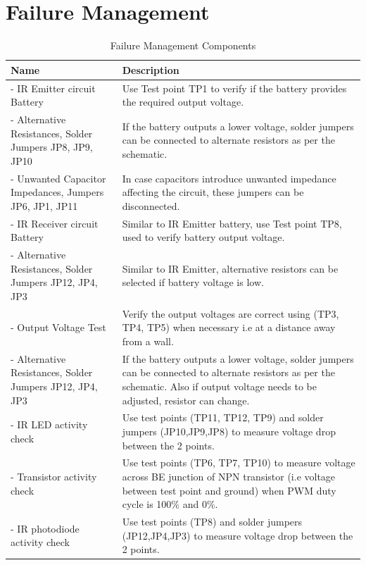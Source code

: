 \documentclass[class=report,11pt,crop=false]{standalone}
\begin{document}
  
\section{Failure Management}

\begin{table}[h]
    \centering
    \caption{Failure Management Components} 
    \label{tab:failuremanagement}
    \begin{tabular}{|p{5cm}|p{10cm}|}
        \hline
        \textbf{Name} & \textbf{Description} \\
        \hline
        - IR Emitter circuit Battery & Use Test point TP1 to verify if the battery provides the required output voltage. \\
        \hline
        - Alternative Resistances, Solder Jumpers JP8, JP9, JP10 & If the battery outputs a lower voltage, solder jumpers can be connected to alternate resistors as per the schematic. \\
        \hline
        - Unwanted Capacitor Impedances, Jumpers JP6, JP1, JP11 & In case capacitors introduce unwanted impedance affecting the circuit, these jumpers can be disconnected. \\
        \hline
        - IR Receiver circuit Battery & Similar to IR Emitter battery, use Test point TP8, used to verify battery output voltage. \\
        \hline
        - Alternative Resistances, Solder Jumpers JP12, JP4, JP3 & Similar to IR Emitter, alternative resistors can be selected if battery voltage is low. \\
        \hline
        - Output Voltage Test & Verify the output voltages are correct using (TP3, TP4, TP5) when necessary i.e at a distance away from a wall. \\
        \hline
        - Alternative Resistances, Solder Jumpers JP12, JP4, JP3 & If the battery outputs a lower voltage, solder jumpers can be connected to alternate resistors as per the schematic. Also if output voltage needs to be adjusted, resistor can change. \\
        \hline
        - IR LED activity check & Use test points (TP11, TP12, TP9) and solder jumpers (JP10,JP9,JP8) to measure voltage drop between the 2 points. \\
        \hline
        - Transistor activity check & Use test points (TP6, TP7, TP10) to measure voltage across BE junction of NPN transistor (i.e voltage between test point and ground) when PWM duty cycle is 100\% and 0\%. \\
        \hline
        - IR photodiode activity check & Use test points (TP8) and solder jumpers (JP12,JP4,JP3) to measure voltage drop between the 2 points. \\
        \hline
    \end{tabular}
\end{table}
\end{document}
